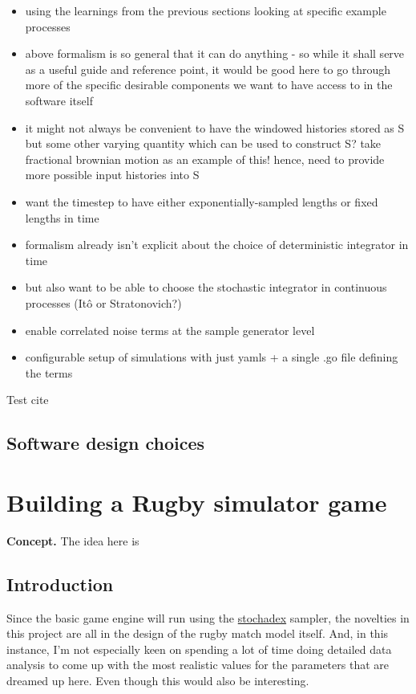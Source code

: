 \documentclass{book}
\begin{document}
\begin{itemize}
\item{using the learnings from the previous sections looking at specific example processes}
\item{above formalism is so general that it can do anything - so while it shall serve as a useful guide and reference point, it would be good here to go through more of the specific desirable components we want to have access to in the software itself}
\item{it might not always be convenient to have the windowed histories stored as S but some other varying quantity which can be used to construct S? take fractional brownian motion as an example of this! hence, need to provide more possible input histories into S}
\item{want the timestep to have either exponentially-sampled lengths or fixed lengths in time}
\item{formalism already isn't explicit about the choice of deterministic integrator in time}
\item{but also want to be able to choose the stochastic integrator in continuous processes (Itô or Stratonovich?)}
\item{enable correlated noise terms at the sample generator level}
\item{configurable setup of simulations with just yamls + a single .go file defining the terms}
\end{itemize}


Test cite~\cite{Dimastrogiovanni:2018xnn}

\section{\sffamily Software design choices}

\chapter{\sffamily Building a Rugby simulator game}

\vspace*{1cm}
{\bfseries\sffamily Concept.} The idea here is 

\vspace*{1cm}
\section{\sffamily Introduction}

Since the basic game engine will run using the \href{https://github.com/umbralcalc/stochadex}{stochadex} sampler, the novelties in this project are all in the design of the rugby match model itself. And, in this instance, I'm not especially keen on spending a lot of time doing detailed data analysis to come up with the most realistic values for the parameters that are dreamed up here. Even though this would also be interesting.
\end{document}
